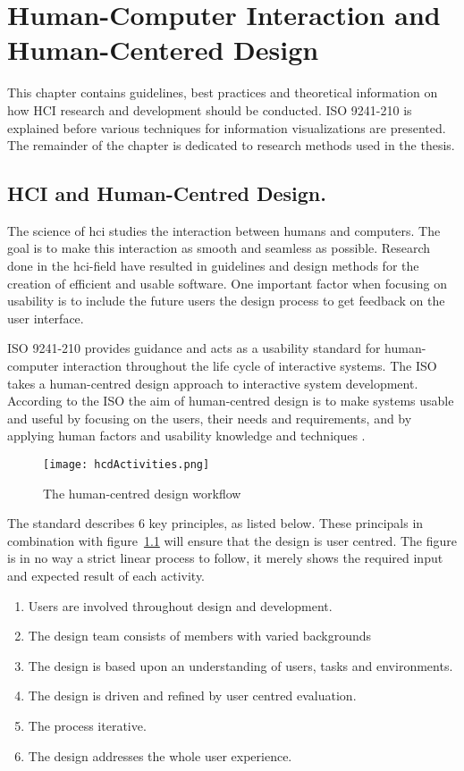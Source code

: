 \chapter{Human-Computer Interaction and Human-Centered Design}
\label{ch:hci}
This chapter contains guidelines, best practices and theoretical information on how HCI research and development should be conducted. ISO 9241-210 is explained before various techniques for information visualizations are presented. The remainder of the chapter is dedicated to research methods used in the thesis.

\section{HCI and Human-Centred Design.}
The science of \gls{hci} studies the interaction between humans and computers. The goal is to make this interaction as smooth and seamless as possible. Research done in the \gls{hci}-field have resulted in guidelines and design methods for the creation of efficient and usable software. One important factor when focusing on usability is to include the future users the design process to get feedback on the user interface.

ISO 9241-210 provides guidance and acts as a usability standard for human-computer interaction throughout the life cycle of interactive systems. The ISO takes a human-centred design approach to interactive system development. According to the ISO the aim of human-centred design is to make systems usable and useful by focusing on the users, their needs and requirements, and by applying human factors and usability knowledge and techniques \cite{iso9241}.

\begin{figure}[h!]
	\centering
		\texttt{[image: hcdActivities.png]}
		\caption{\footnotesize The human-centred design workflow}
		\label{fig:hcdActivities}
\end{figure}

The standard describes 6 key principles, as listed below. These principals in combination with figure~\ref{fig:hcdActivities} will ensure that the design is user centred. The figure is in no way a strict linear process to follow, it merely shows the required input and expected result of each activity.

\begin{enumerate}
  \item Users are involved throughout design and development.
  \item The design team consists of members with varied backgrounds
  \item The design is based upon an understanding of users, tasks and environments.
  \item The design is driven and refined by user centred evaluation.
  \item The process iterative.
  \item The design addresses the whole user experience.
\end{enumerate}

